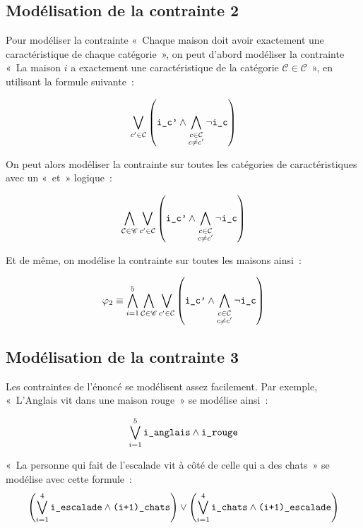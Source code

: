 \subsection{Modélisation de la contrainte 2}
Pour modéliser la contrainte «~Chaque maison doit avoir exactement une
caractéristique de chaque catégorie~», on peut d’abord modéliser la contrainte
«~La maison $i$ a exactement une caractéristique de la catégorie
$\mathcal C \in \mathscr C$~», en utilisant la formule suivante~:

\begin{equation*}
    \bigvee_{c'\in\mathcal C} \left(\verb|i_c'| \wedge \bigwedge_{\substack{c\in\mathcal C \\ c \ne c'}} \neg \verb|i_c| \right)
\end{equation*}

On peut alors modéliser la contrainte sur toutes les catégories de
caractéristiques avec un «~et~» logique~:

\begin{equation*}
    \bigwedge_{\mathcal C \in \mathscr C} \bigvee_{c'\in\mathcal C} \left(\verb|i_c'| \wedge \bigwedge_{\substack{c\in\mathcal C \\ c \ne c'}} \neg \verb|i_c| \right)
\end{equation*}

Et de même, on modélise la contrainte sur toutes les maisons ainsi~:

\begin{equation*}
    \varphi_2 \equiv \bigwedge_{i=1}^5 \bigwedge_{\mathcal C \in \mathscr C}\bigvee_{c'\in\mathcal C} \left(\verb|i_c'| \wedge \bigwedge_{\substack{c\in\mathcal C \\ c \ne c'}} \neg \verb|i_c| \right)
\end{equation*}

\subsection{Modélisation de la contrainte 3}
Les contraintes de l’énoncé se modélisent assez facilement. Par exemple,
«~L’Anglais vit dans une maison rouge~» se modélise ainsi~:

\begin{equation*}
    \bigvee_{i=1}^5 \verb|i_anglais| \wedge \verb|i_rouge|
\end{equation*}

«~La personne qui fait de l’escalade vit à côté de celle qui a des chats~» se
modélise avec cette formule~:
\begin{equation*}
    \left(\bigvee_{i=1}^4 \verb|i_escalade| \wedge \verb|(i+1)_chats|\right) \vee
    \left(\bigvee_{i=1}^4 \verb|i_chats| \wedge \verb|(i+1)_escalade|\right)
\end{equation*}

